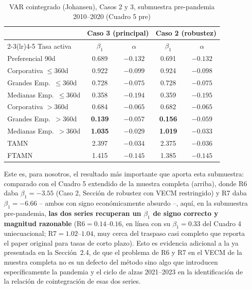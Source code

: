 \documentclass[12pt, letterpaper]{article}
\begin{document}
\begin{table}[ht]
\renewcommand{\thetable}{15}
\begin{threeparttable}
\caption{VAR cointegrado (Johansen), Casos 2 y 3, submuestra
         pre-pandemia 2010--2020 (Cuadro 5 pre)}
\label{tab:cuadro5pre}
\small
\begin{tabular}{lcccc}
\toprule
& \multicolumn{2}{c}{Caso 3 (principal)} & \multicolumn{2}{c}{Caso 2 (robustez)} \\
\cmidrule(lr){2-3}\cmidrule(lr){4-5}
Tasa activa & $\beta_1$ & $\alpha$ & $\beta_1$ & $\alpha$ \\
\midrule
Preferencial 90d         & 0.689 & $-0.132$ & 0.691 & $-0.132$ \\
Corporativa $\le$360d    & 0.922 & $-0.099$ & 0.924 & $-0.098$ \\
Grandes Emp.\ $\le$360d  & 0.728 & $-0.075$ & 0.728 & $-0.075$ \\
Medianas Emp.\ $\le$360d & 0.358 & $-0.194$ & 0.359 & $-0.195$ \\
Corporativa $>$360d      & 0.684 & $-0.065$ & 0.682 & $-0.065$ \\
Grandes Emp.\ $>$360d    & \textbf{0.139} & $-0.057$ & \textbf{0.156} & $-0.059$ \\
Medianas Emp.\ $>$360d   & \textbf{1.035} & $-0.029$ & \textbf{1.019} & $-0.033$ \\
TAMN                     & 2.397 & $-0.034$ & 2.375 & $-0.036$ \\
FTAMN                    & 1.415 & $-0.145$ & 1.385 & $-0.145$ \\
\bottomrule
\end{tabular}
\begin{tablenotes}[flushleft]
\footnotesize\item
Este es, para nosotros, el resultado más importante que aporta esta
submuestra: comparado con el Cuadro 5 extendido de la muestra
completa (arriba), donde R6 daba $\beta_1=-3.55$ (Caso 2, Sección de
robustez con VECM restringido) y R7 daba $\beta_1=-6.66$ -- ambos con
signo económicamente absurdo --, aquí, en la submuestra pre-pandemia,
\textbf{las dos series recuperan un $\beta_1$ de signo correcto y
magnitud razonable} (R6$=0.14$--$0.16$, en línea con su $\beta_1=0.33$
del Cuadro 4 uniecuacional; R7$=1.02$--$1.04$, muy cerca del traspaso
casi completo que reporta el paper original para tasas de corto
plazo). Esto es evidencia adicional a la ya presentada en la
Sección~2.4, de que el problema de R6 y R7 en el VECM de la muestra
completa no es un defecto del método sino algo que introducen
específicamente la pandemia y el ciclo de alzas 2021--2023 en la
identificación de la relación de cointegración de esas dos series.
\end{tablenotes}
\end{threeparttable}
\end{table}
\end{document}

